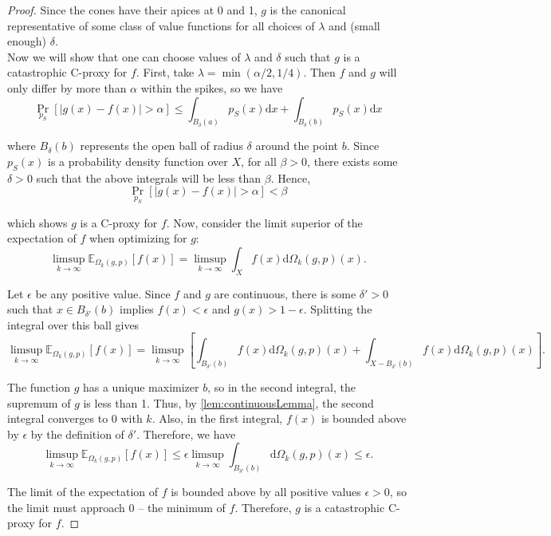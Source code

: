 \documentclass{article}
\begin{document}
\begin{proof}
Since the cones have their apices at 0 and 1, $g$ is the canonical representative of some class of value functions for all choices of $\lambda$ and (small enough) $\delta$.\\

Now we will show that one can choose values of $\lambda$ and $\delta$ such that $g$ is a catastrophic C-proxy for $f$. First, take $\lambda = \min(\alpha/2, 1/4)$. Then $f$ and $g$ will only differ by more than $\alpha$ within the spikes, so we have
$$\Pr_{p_S}[|g(x) - f(x)| > \alpha] \leq \int_{B_{\delta}(a)} p_S(x) \mathrm dx + \int_{B_{\delta}(b)} p_S(x) \mathrm dx$$

where $B_{\delta}(b)$ represents the open ball of radius $\delta$ around the point $b$. Since $p_S(x)$ is a probability density function over $X$, for all $\beta > 0$, there exists some $\delta > 0$ such that the above integrals will be less than $\beta$. Hence,
$$\Pr_{p_S}[|g(x) - f(x)| > \alpha] < \beta$$

which shows $g$ is a C-proxy for $f$. Now, consider the limit superior of the expectation of $f$ when optimizing for $g$:
$$\limsup_{k \rightarrow \infty} \mathbb E_{\Omega_k(g,p)}[f(x)] = \limsup_{k \rightarrow \infty} \int_{X}f(x) \mathrm d \Omega_k(g,p)(x).$$

Let $\epsilon$ be any positive value. Since $f$ and $g$ are continuous, there is some $\delta' > 0$ such that $x \in B_{\delta'}(b)$ implies $f(x) < \epsilon$ and $g(x) > 1-\epsilon$. Splitting the integral over this ball gives
$$\limsup_{k \rightarrow \infty} \mathbb E_{\Omega_k(g,p)}[f(x)] = \limsup_{k \rightarrow \infty} \left[ \int_{B_{\delta'}(b)}f(x) \mathrm d \Omega_k(g,p)(x) + \int_{X - B_{\delta'}(b)}f(x) \mathrm d \Omega_k(g,p)(x) \right].$$

The function $g$ has a unique maximizer $b$, so in the second integral, the supremum of $g$ is less than 1. Thus, by \cref{lem:continuousLemma}, the second integral converges to 0 with $k$. Also, in the first integral, $f(x)$ is bounded above by $\epsilon$ by the definition of $\delta'$. Therefore, we have
$$\limsup_{k \rightarrow \infty} \mathbb E_{\Omega_k(g,p)}[f(x)] \leq \epsilon \limsup_{k \rightarrow \infty} \int_{B_{\delta'}(b)} \mathrm d \Omega_k(g,p)(x) \leq \epsilon.$$

The limit of the expectation of $f$ is bounded above by all positive values $\epsilon > 0$, so the limit must approach $0$ -- the minimum of $f$. Therefore, $g$ is a catastrophic C-proxy for $f$.
\end{proof}
\end{document}
